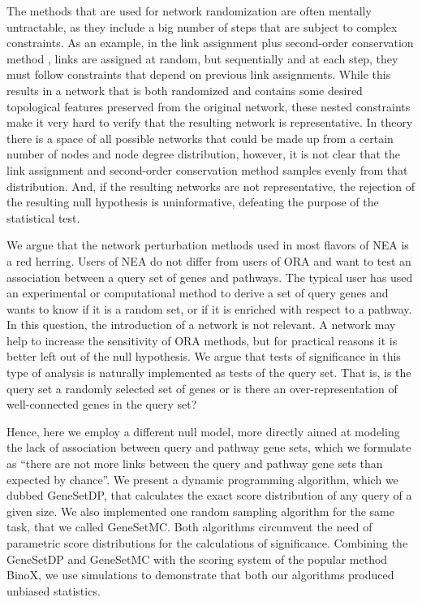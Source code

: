 \documentclass[10pt,letterpaper]{article}
\begin{document}
The methods that are used for network randomization are often mentally untractable, as they include a big number of steps that are subject to complex constraints.
As an example, in the link assignment plus second-order conservation method \cite{mccormack2013statistical}, links are assigned at random, but sequentially and at each step, they must follow constraints that depend on previous link assignments.
While this results in a network that is both randomized and contains some desired topological features preserved from the original network, these nested constraints make it very hard to verify that the resulting network is representative. In theory there is a space of all possible networks that could be made up from a certain number of nodes and node degree distribution, however, it is not clear that the link assignment and second-order conservation method samples evenly from that distribution.  And, if the resulting networks are not representative, the rejection of the resulting null hypothesis is uninformative, defeating the purpose of the statistical test.

We argue that the network perturbation methods used in most flavors of NEA is a red herring. Users of NEA do not differ from users of ORA and want to test an association between a query set of genes and pathways.  The typical user has used an experimental or computational method to derive a set of query genes and wants to know if it is a random set, or if it is enriched with respect to a pathway.  In this question, the introduction of a network is not relevant. A network may help to increase the sensitivity of ORA methods, but for practical reasons it is better left out of the null hypothesis. We argue that tests of significance in this type of analysis is naturally implemented as tests of the query set. That is, is the query set a randomly selected set of genes or is there an over-representation of well-connected genes in the query set?

Hence, here we employ a different null model, more directly aimed at modeling the lack of association between query and pathway gene sets, which we formulate as ``there are not more links between the query and pathway gene sets than expected by chance''. We present a dynamic programming algorithm, which we dubbed GeneSetDP, that calculates the exact score distribution of any query of a given size. We also implemented one random sampling algorithm for the same task, that we called GeneSetMC. Both algorithms circumvent the need of parametric score distributions for the calculations of significance.
Combining the GeneSetDP and GeneSetMC with the scoring system of the popular method BinoX, we use simulations to demonstrate that both our algorithms produced unbiased statistics.
\end{document}
